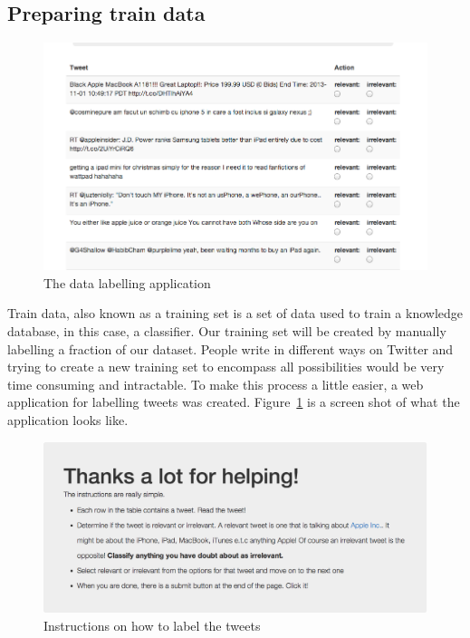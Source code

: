 \subsection{Preparing train data}
\begin{figure}
  \begin{center}
    \includegraphics[scale=0.6]{figures/datalabeller}
  \end{center}
  \caption{The data labelling application}
\label{fig:labeller}
\end{figure}

Train data, also known as a training set is a set of data used to train a knowledge database, in
this case, a classifier. Our training set will be created by manually labelling a fraction of our
dataset. People write in different ways on Twitter and trying to create a new training set to
encompass all possibilities would be very time consuming and intractable. To make this process a
little easier, a web application for labelling tweets was created. Figure~\ref{fig:labeller} is a
screen shot of what the application looks like.

\begin{figure}
  \begin{center}
    \includegraphics[scale=0.4]{figures/labeller_instructions}
  \end{center}
  \caption{Instructions on how to label the tweets}
\label{fig:labeller_instructions}
\end{figure}

